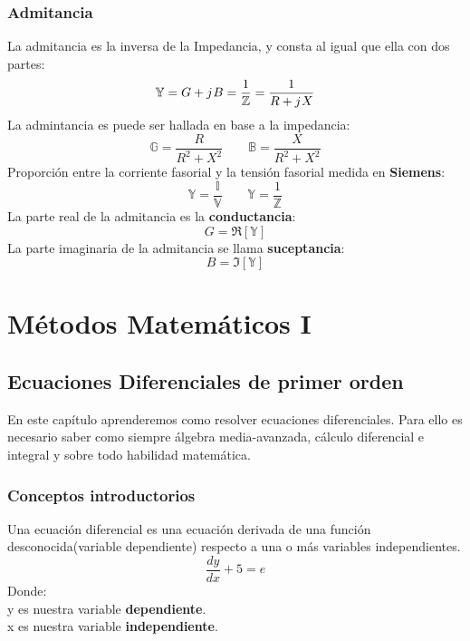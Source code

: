 \documentclass[
	12pt, %
	fleqn, %
	a4paper, %
]{LegrandOrangeBook}
\begin{document}
\section{Admitancia}\label{Admitancia}
La admitancia es la inversa de la Impedancia, y consta al igual que ella con dos partes:
\begin{equation*}
\mathbb{Y}=G+{j\mkern1mu} B=\frac{1}{\mathbb{Z}}=\frac{1}{R+{j\mkern1mu} X}
\end{equation*}
La admintancia es puede ser hallada en base a la impedancia:
\begin{equation*}
\mathbb{G}=\frac{R}{R^2+X^2}
\qquad
\mathbb{B}=\frac{X}{R^2+X^2}
\end{equation*}
Proporción entre la corriente fasorial y la tensión fasorial medida en \textbf{Siemens}:
\begin{equation*}
\mathbb{Y}=\frac{\mathbb{I}}{\mathbb{V}}
\qquad
\mathbb{Y}=\frac{1}{\mathbb{Z}}
\end{equation*}
La parte real de la admitancia es la \textbf{conductancia}:
\begin{displaymath}
G=\Re[\mathbb{Y}]
\end{displaymath}
La parte imaginaria de la admitancia se llama \textbf{suceptancia}:
\begin{displaymath}
B=\Im[\mathbb{Y}]
\end{displaymath}
\part{Métodos Matemáticos I}
\chapter{Ecuaciones Diferenciales de primer orden}
En este capítulo aprenderemos como resolver ecuaciones diferenciales. Para ello es necesario saber como siempre álgebra media-avanzada, cálculo diferencial e integral y sobre todo habilidad matemática. 
\section{Conceptos introductorios}
Una ecuación diferencial es una ecuación derivada de una función desconocida(variable dependiente) respecto a una o más variables independientes.
\begin{displaymath}
\frac{dy}{dx}+5=e
\end{displaymath}
Donde:\\
y es nuestra variable \textbf{dependiente}.\\
x es nuestra variable \textbf{independiente}.\\
\end{document}
